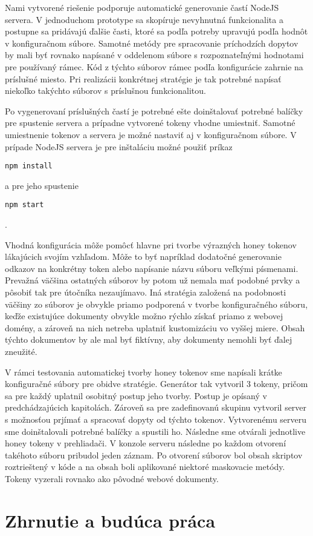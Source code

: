 \documentclass[conference, 11pt,slovak,a4paper,twoside]{IEEEtran}
\begin{document}
Nami vytvorené riešenie podporuje automatické generovanie častí NodeJS servera. V jednoduchom prototype sa skopíruje nevyhnutná funkcionalita a postupne sa pridávajú ďalšie časti, ktoré sa podľa potreby upravujú podľa hodnôt v konfiguračnom súbore. Samotné metódy pre spracovanie príchodzích dopytov by mali byť rovnako napísané v oddelenom súbore s rozpoznateľnými hodnotami pre používaný rámec. Kód z týchto súborov rámec podľa konfigurácie zahrnie na príslušné miesto. Pri realizácii konkrétnej stratégie je tak potrebné napísať niekoľko takýchto súborov s príslušnou funkcionalitou. 

Po vygenerovaní príslušných častí je potrebné ešte doinštalovať potrebné balíčky pre spustenie servera a prípadne vytvorené tokeny vhodne umiestniť. Samotné umiestnenie tokenov a servera je možné nastaviť aj v konfiguračnom súbore. V prípade NodeJS servera je pre inštaláciu možné použiť príkaz 

\begin{lstlisting}
npm install
\end{lstlisting} 

a pre jeho spustenie 

\begin{lstlisting}
npm start
\end{lstlisting}.

Vhodná konfigurácia môže pomôcť hlavne pri tvorbe výrazných honey tokenov lákajúcich svojím vzhľadom. Môže to byť napríklad dodatočné generovanie odkazov na konkrétny token alebo napísanie názvu súboru veľkými písmenami. Prevažná väčšina ostatných súborov by potom už nemala mať podobné prvky a pôsobiť tak pre útočníka nezaujímavo. Iná stratégia založená na podobnosti väčšiny zo súborov je obvykle priamo podporená v tvorbe konfiguračného súboru, keďže existujúce dokumenty obvykle možno rýchlo získať priamo z webovej domény, a zároveň na nich netreba uplatniť kustomizáciu vo vyššej miere. Obsah týchto dokumentov by ale mal byť fiktívny, aby dokumenty nemohli byť ďalej zneužité.

V rámci testovania automatickej tvorby honey tokenov sme napísali krátke konfiguračné súbory pre obidve stratégie. Generátor tak vytvoril 3 tokeny, pričom sa pre každý uplatnil osobitný postup jeho tvorby. Postup je opísaný v predchádzajúcich kapitolách. Zároveň sa pre zadefinovanú skupinu vytvoril server s možnosťou prjímať a spracovať dopyty od týchto tokenov. Vytvorenému serveru sme doinštalovali potrebné balíčky a spustili ho. Následne sme otvárali jednotlive honey tokeny v prehliadači. V konzole serveru následne po každom otvorení takéhoto súboru pribudol jeden záznam. Po otvorení súborov bol obsah skriptov roztrieštený v kóde a na obsah boli aplikované niektoré maskovacie metódy. Tokeny vyzerali rovnako ako pôvodné webové dokumenty.  



\section{Zhrnutie a budúca práca}



\end{document}
